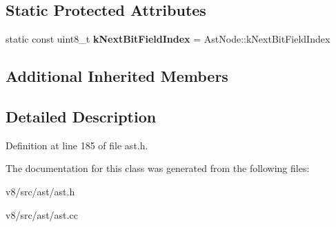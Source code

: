 \subsection*{Static Protected Attributes}
\begin{DoxyCompactItemize}
\item 
\mbox{\label{classv8_1_1internal_1_1Statement_ade80dffe8357681af4253e838968a527}} 
static const uint8\+\_\+t {\bfseries k\+Next\+Bit\+Field\+Index} = Ast\+Node\+::k\+Next\+Bit\+Field\+Index
\end{DoxyCompactItemize}
\subsection*{Additional Inherited Members}


\subsection{Detailed Description}


Definition at line 185 of file ast.\+h.



The documentation for this class was generated from the following files\+:\begin{DoxyCompactItemize}
\item 
v8/src/ast/ast.\+h\item 
v8/src/ast/ast.\+cc\end{DoxyCompactItemize}
